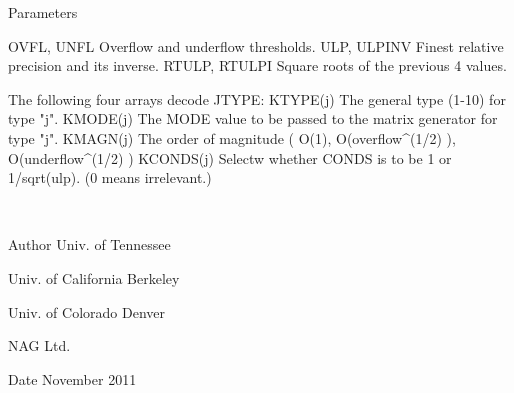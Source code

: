 \begin{DoxyParams}[1]{Parameters}
\begin{DoxyVerb}
     OVFL, UNFL      Overflow and underflow thresholds.
     ULP, ULPINV     Finest relative precision and its inverse.
     RTULP, RTULPI   Square roots of the previous 4 values.

             The following four arrays decode JTYPE:
     KTYPE(j)        The general type (1-10) for type "j".
     KMODE(j)        The MODE value to be passed to the matrix
                     generator for type "j".
     KMAGN(j)        The order of magnitude ( O(1),
                     O(overflow^(1/2) ), O(underflow^(1/2) )
     KCONDS(j)       Selectw whether CONDS is to be 1 or
                     1/sqrt(ulp).  (0 means irrelevant.)\end{DoxyVerb}
 \\
\hline
\end{DoxyParams}
\begin{DoxyAuthor}{Author}
Univ. of Tennessee 

Univ. of California Berkeley 

Univ. of Colorado Denver 

N\+A\+G Ltd. 
\end{DoxyAuthor}
\begin{DoxyDate}{Date}
November 2011 
\end{DoxyDate}
\hypertarget{group__single__eig_gac7154f368e4073c5194d3976de3c83e8}{}
